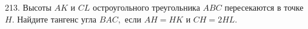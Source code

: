 213. Высоты  $AK$ и  $CL$ остроугольного треугольника  $ABC$ пересекаются в точке  $H.$ Найдите тангенс угла
$BAC,$ если  $AH=HK$ и  $CH=2HL.$\\
